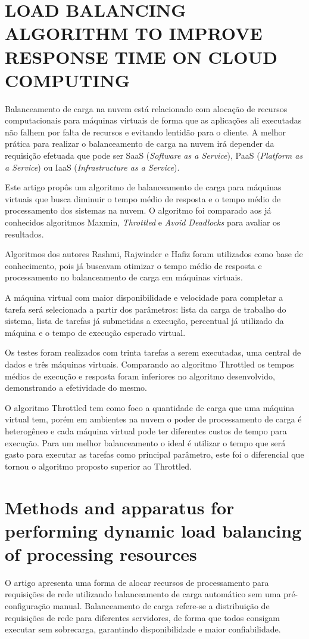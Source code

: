 \section{LOAD BALANCING ALGORITHM TO IMPROVE RESPONSE TIME ON CLOUD COMPUTING}
	Balanceamento de carga na nuvem está relacionado com alocação de recursos computacionais para máquinas virtuais de forma que as aplicações ali executadas não falhem por falta de recursos e evitando lentidão para o cliente. A melhor prática para realizar o balanceamento de carga na nuvem irá depender da requisição efetuada que pode ser SaaS (\textit{Software as a Service}), PaaS (\textit{Platform as a Service}) ou IaaS (\textit{Infrastructure as a Service}).
	
	Este artigo propôs um algoritmo de balanceamento de carga para máquinas virtuais que busca diminuir o tempo médio de resposta e o tempo médio de processamento dos sistemas na nuvem. O algoritmo foi comparado aos já conhecidos algoritmos Maxmin, \textit{Throttled} e \textit{Avoid Deadlocks} para avaliar os resultados.
	
	Algoritmos dos autores Rashmi, Rajwinder e Hafiz foram utilizados como base de conhecimento, pois já buscavam otimizar o tempo médio de resposta e processamento no balanceamento de carga em máquinas virtuais. 
	
	A máquina virtual com maior disponibilidade e velocidade para completar a tarefa será selecionada a partir dos parâmetros: lista da carga de trabalho do sistema, lista de tarefas já submetidas a execução, percentual já utilizado da máquina e o tempo de execução esperado virtual. 
	
	Os testes foram realizados com trinta tarefas a serem executadas, uma central de dados e três máquinas virtuais. Comparando ao algoritmo Throttled os tempos médios de execução e resposta foram inferiores no algoritmo desenvolvido, demonstrando a efetividade do mesmo.
	
	O algoritmo Throttled tem como foco a quantidade de carga que uma máquina virtual tem, porém em ambientes na nuvem o poder de processamento de carga é heterogêneo e cada máquina virtual pode ter diferentes custos de tempo para execução. Para um melhor balanceamento o ideal é utilizar o tempo que será gasto para executar as tarefas como principal parâmetro, este foi o diferencial que tornou o algoritmo proposto superior ao Throttled.

\section{Methods and apparatus for performing dynamic load balancing of processing resources}
	O artigo apresenta uma forma de alocar recursos de processamento para requisições de rede utilizando balanceamento de carga automático sem uma pré-configuração manual. Balanceamento de carga refere-se a distribuição de requisições de rede para diferentes servidores, de forma que todos consigam executar sem sobrecarga, garantindo disponibilidade e maior confiabilidade.
	
